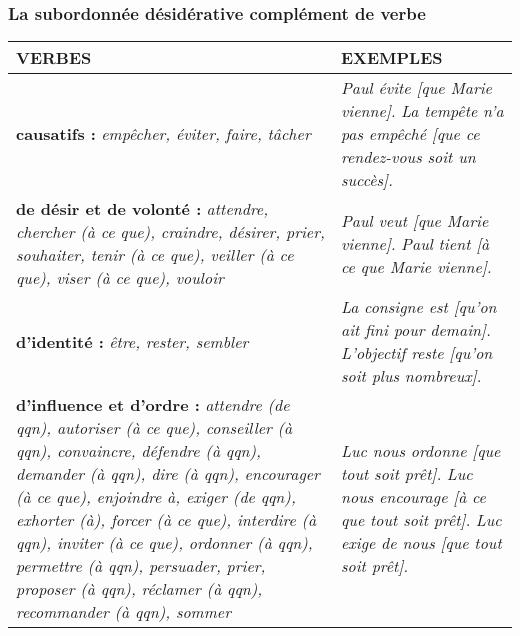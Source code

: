 \documentclass[UTF8]{report}
\begin{document}
\subsubsection{La subordonnée désidérative complément de verbe}
\begin{table}[H]
    \centering

    \begin{tabular}{| L{6.5cm} | L{8.5cm} |} %
    \hline %
    \textbf{VERBES} & \textbf{EXEMPLES} \\
    \hline %
    \textbf{causatifs :} \newline \textit{empêcher, éviter, faire, tâcher} & \textit{Paul évite [que Marie vienne].} \newline \textit{La tempête n'a pas empêché [que ce rendez-vous soit un succès].} \\
    \hline
    \textbf{de désir et de volonté :} \newline \textit{attendre, chercher (à ce que), craindre, désirer, prier, souhaiter, tenir (à ce que), veiller (à ce que), viser (à ce que), vouloir} & \textit{Paul veut [que Marie vienne].} \newline \textit{Paul tient [à ce que Marie vienne].} \\
    \hline
    \textbf{d'identité :} \newline \textit{être, rester, sembler} & \textit{La consigne est [qu'on ait fini pour demain].} \newline \textit{L'objectif reste [qu'on soit plus nombreux].} \\
    \hline
    \textbf{d'influence et d'ordre :} \newline \textit{attendre (de qqn), autoriser (à ce que), conseiller (à qqn), convaincre, défendre (à qqn), demander (à qqn), dire (à qqn), encourager (à ce que), enjoindre à, exiger (de qqn), exhorter (à), forcer (à ce que), interdire (à qqn), inviter (à ce que), ordonner (à qqn), permettre (à qqn), persuader, prier, proposer (à qqn), réclamer (à qqn), recommander (à qqn), sommer} & \textit{Luc nous ordonne [que tout soit prêt].} \newline \textit{Luc nous encourage [à ce que tout soit prêt].} \newline \textit{Luc exige de nous [que tout soit prêt].} \\
    \bottomrule %
    \end{tabular}
\end{table}
\end{document}
